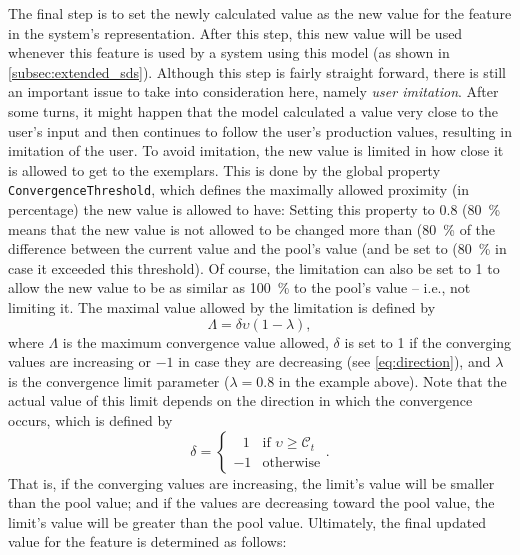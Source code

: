 The final step is to set the newly calculated value as the new value for the feature in the system's representation.
After this step, this new value will be used whenever this feature is used by a system using this model (as shown in \cref{subsec:extended_sds}).
Although this step is fairly straight forward, there is still an important issue to take into consideration here, namely \textit{user imitation}.
After some turns, it might happen that the model calculated a value very close to the user's input and then continues to follow the user's production values, resulting in imitation of the user.
To avoid imitation, the new value is limited in how close it is allowed to get to the exemplars.
This is done by the global property \texttt{ConvergenceThreshold}, which defines the maximally allowed proximity (in percentage) the new value is allowed to have:
Setting this property to 0.8 (\SI{80}{\percent} means that the new value is not allowed to be changed more than (\SI{80}{\percent} of the difference between the current value and the pool's value (and be set to (\SI{80}{\percent} in case it exceeded this threshold).
Of course, the limitation can also be set to 1 to allow the new value to be as similar as \SI{100}{\percent} to the pool's value -- i.e., not limiting it.
The maximal value allowed by the limitation is defined by
%
\begin{equation}
	\label{eq:conv_limit}
	\Lambda = \delta \upsilon \left(1 - \lambda \right),
\end{equation}
\noindent
%
where $\Lambda$ is the maximum convergence value allowed, $\delta$ is set to 1 if the converging values are increasing or $-1$ in case they are decreasing (see \cref{eq:direction}), and $\lambda$ is the convergence limit parameter ($\lambda=0.8$ in the example above).
\noindent
Note that the actual value of this limit depends on the direction in which the convergence occurs, which is defined by
%
\begin{equation}
	\label{eq:direction}
	\delta = 		
	\begin{cases}
		\ \ \ 1 & \text{if } \upsilon \geq \mathcal{C}_t\\
		-1 & \text{otherwise}
	\end{cases}.
\end{equation}
\noindent
%
That is, if the converging values are increasing, the limit's value will be smaller than the pool value;
and if the values are decreasing toward the pool value, the limit's value will be greater than the pool value.
Ultimately, the final updated value for the feature is determined as follows:
